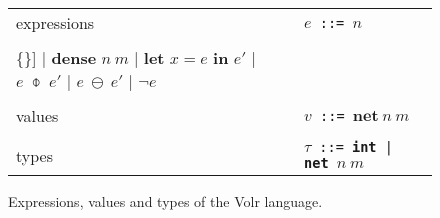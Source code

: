 \begin{figure}
  \begin{tabular}[t]{l l}
    expressions & \texttt{$e$ ::= $n$} \\
    & \begin{minipage}{0.6\textwidth}
      \begin{Verbatim}[mathescape,commandchars=\\\{\}]
    | \textbf{dense} $n\ m$
    | \textbf{let} $x = e$ \textbf{in} $e'$
    | $e\ \obar\ e'$
    | $e\ \ominus\ e'$
    | $\neg e$
      \end{Verbatim} 
      \end{minipage} \\

    & \\ %

    values
    & \texttt{$v$ ::= $\textbf{net}\ n\ m$} \\
    
    & \\ %
    types
    & \texttt{$\tau$ ::= \textbf{int} | \textbf{net} $n\ m$} \\
  \end{tabular}

  \caption{Expressions, values and types of the Volr language.}
  \label{fig:volr-expr}
\end{figure}